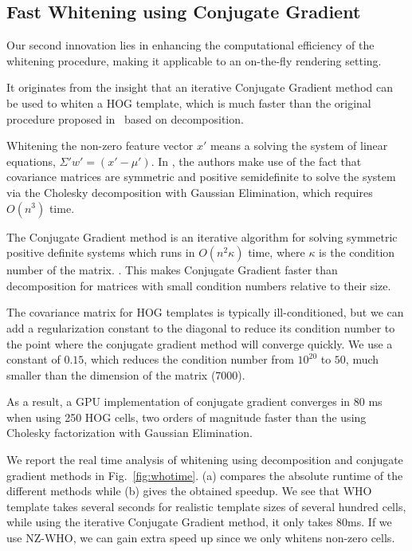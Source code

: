 \subsection{Fast Whitening using Conjugate Gradient}
\label{sec:fastwhiten}
Our second innovation lies in enhancing the computational efficiency
of the whitening procedure, making it applicable to an on-the-fly
rendering setting.

It originates from the insight that an iterative
Conjugate Gradient method can be used to whiten a HOG template, which
is much faster than the original procedure proposed
in~\cite{Hariharan12} based on decomposition.

Whitening the non-zero
feature vector $x'$ means a solving the system of linear equations, $\Sigma' w' = (x' -
\mu')$. In
\cite{Hariharan12}, the authors make use of the fact that covariance matrices
are symmetric and positive semidefinite to solve the system via the Cholesky
decomposition with Gaussian Elimination, which requires $O(n^3)$ time.

The Conjugate Gradient method is an iterative algorithm for solving symmetric
positive definite systems which runs in $O(n^2\kappa)$ time, where $\kappa$ is
the condition number of the matrix. \cite{Shewchuk94}.
%
This makes Conjugate Gradient faster than decomposition for matrices with small condition
numbers relative to their size.

The covariance matrix for HOG templates is typically
ill-conditioned\cite{Hariharan12}, but we
can add a regularization constant to the diagonal to reduce its condition
number to the point where the conjugate gradient method will converge quickly.
We use a constant of $0.15$, which reduces the condition number from $10^{20}$
to $50$, much smaller than the dimension of the matrix (7000).

As a result, a GPU implementation of conjugate gradient converges in 80
ms when using 250 HOG cells, two orders of magnitude faster than the using
Cholesky factorization with Gaussian Elimination.


We report the real time analysis of whitening using decomposition and
conjugate gradient methods in Fig.~\ref{fig:whotime}. (a) compares the
absolute runtime of the different methods while (b) gives the obtained
speedup. We see that %
WHO template takes several seconds for realistic template sizes of
several hundred cells, while using the iterative Conjugate Gradient
method, it only takes 80ms. If we use NZ-WHO, we can gain extra speed
up since we only whitens non-zero cells.

